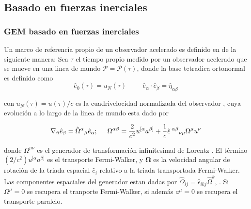 \documentclass[aspectratio=169,10pt,usenames,dvipsnames,spanish]{beamer}
\newcommand{\vg}[1]{\boldsymbol{#1}}   %
\begin{document}
\subsection{Basado en fuerzas inerciales}
\begin{frame}
\frametitle{GEM basado en fuerzas inerciales}

Un marco de referencia propio de un observador acelerado es definido en \parencite{Misner1973} de la siguiente manera: Sea $\tau$ el tiempo propio medido por un observador acelerado que se mueve en una linea de mundo $\mathcal{P}=\mathcal{P}(\tau)$, donde la base tetradica ortonormal es definido como
\begin{equation}\label{Aecu: etetrada}
	\hat{e}_{0}(\tau)=u_{N}(\tau) \hspace{1cm} \hat{e}_{\alpha}\cdot \hat{e}_{\beta}=\hat{\eta}_{\alpha\beta}
\end{equation}

con $u_{N}(\tau)=u(\tau)/c$ es la cuadrivelocidad normalizada del observador \parencite{Hobson2015}, cuya evolución a lo largo de la linea de mundo esta dado por

\begin{equation}\label{Aecu:evolucion tetrada}
	\nabla_{\hat{u}}\hat{e}_{\beta}=\hat{\Omega}^{\alpha}{}_{\beta}\hat{e}_{\alpha}; \hspace{0.5cm} \Omega^{\alpha\beta}=\frac{2}{c^2}u^{[\alpha}a^{\beta]}+\frac{1}{c}\tilde{\epsilon}^{\;\alpha\beta}{}_{\nu\mu}\Omega^\mu u^\nu
\end{equation}

donde $\Omega^{\mu\nu}$ es el generador de transformación infinitesimal de Lorentz \parencite{Misner1973}. El término $(2/c^2)u^{[\alpha}a^{\beta]}$ es el transporte Fermi-Walker, y $\vg{\Omega}$ es la velocidad angular de rotación de la triada espacial $\hat{e}_{i}$ relativo a la triada transportada Fermi-Walker. Las componentes espaciales del generador estan dadas por $\hat{\Omega}_{ij}=\hat{\epsilon}_{ikj}\hat{\Omega}^{k}$,  \parencite{Costa2014}. Si $\Omega^{\mu}=0$ se recupera el tranporte Fermi-Walker, si además $a^{\mu}=0$ se recupera el transporte paralelo.

\end{frame}

\end{document}
